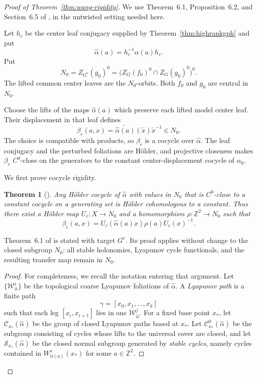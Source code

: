 \documentclass[11pt]{amsart}
\numberwithin{equation}{section}
\theoremstyle{plain}
\newtheorem{thm}{Theorem}[section]
\begin{document}
\begin{proof}[Proof of Theorem~\ref{thm:wang-rigidity}]
We use Theorem~6.1, Proposition~6.2, and Section~6.5 of
\cite{Wang26}, in the untwisted setting needed here.

Let $h_c$ be the center leaf conjugacy supplied by
Theorem~\ref{thm:highrankgph} and put
\[
\widehat\alpha(a)=h_c^{-1}\alpha(a)h_c.
\]
Put
\[
N_0=Z_{G^c}(g_0)^0
=\bigl(Z_G(f_0)^0\cap Z_G(g_0)^0\bigr)^0.
\]
The lifted common center leaves are the $N_0$-orbits.  Both $f_0$ and
$g_0$ are central in $N_0$.

Choose the lifts of the maps $\widehat\alpha(a)$ which preserve each
lifted model center leaf.  Their displacement in that leaf defines
\begin{equation}\label{eq:appendix-center-cocycle}
\beta_c(a,x)
=
\widetilde{\widehat\alpha(a)}(\tilde x)\tilde x^{-1}
\in N_0.
\end{equation}
The choice is compatible with products, so $\beta_c$ is a cocycle over
$\widehat\alpha$.  The leaf conjugacy and the perturbed foliations are
H\"older, and projective closeness makes $\beta_c$ $C^0$-close on the
generators to the constant center-displacement cocycle of $\alpha_0$.

We first prove cocycle rigidity.

\begin{thm}[{\cite[Theorem~6.1]{Wang26}}]
\label{thm:cocrig}
Any H\"older cocycle of $\widehat\alpha$ with values in $N_0$ that is
$C^0$-close to a constant cocycle on a generating set is H\"older
cohomologous to a constant.  Thus there exist a H\"older map
$U_c:X\to N_0$ and a homomorphism
$\rho:\mathbb Z^2\to N_0$ such that
\begin{equation}\label{eq:appendix-cohomology}
\beta_c(a,x)
=
U_c(\widehat\alpha(a)x)\rho(a)U_c(x)^{-1}.
\end{equation}
\end{thm}

Theorem~6.1 of \cite{Wang26} is stated with target $G^c$.
Its proof applies without change to the closed subgroup $N_0$: all stable
holonomies, Lyapunov cycle functionals, and the resulting transfer map
remain in $N_0$.
\begin{proof}
    For completeness, we recall the notation entering that argument.  Let
$\{\mathcal W^i_{\widehat\alpha}\}$ be the topological coarse Lyapunov
foliations of $\widehat\alpha$.  A \emph{Lyapunov path} is a finite path
\[
\gamma=[x_0,x_1,\ldots,x_k]
\]
such that each leg $[x_i,x_{i+1}]$ lies in one
$\mathcal W^j_{\widehat\alpha}$.  For a fixed base point $x_*$, let
$\mathcal C_{x_*}(\widehat\alpha)$ be the group of closed Lyapunov paths
based at $x_*$.  Let
$\mathcal C^0_{x_*}(\widehat\alpha)$ be the subgroup consisting of cycles
whose lifts to the universal cover are closed, and let
$\mathcal S_{x_*}(\widehat\alpha)$ be the closed normal subgroup generated
by \emph{stable cycles}, namely cycles contained in
$W^s_{\widehat\alpha(a)}(x_*)$ for some $a\in\mathbb Z^2$.


\end{proof}
\end{proof}
\end{document}
